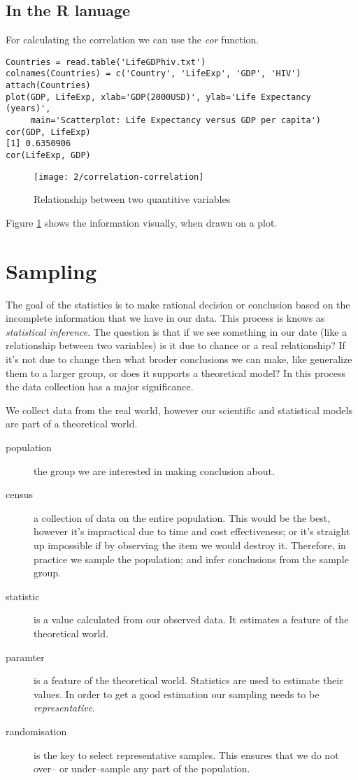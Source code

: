 \subsection{In the R lanuage}

For calculating the correlation we can use the \emph{cor} function.
 
\begin{verbatim}
Countries = read.table('LifeGDPhiv.txt')
colnames(Countries) = c('Country', 'LifeExp', 'GDP', 'HIV')
attach(Countries)
plot(GDP, LifeExp, xlab='GDP(2000USD)', ylab='Life Expectancy (years)', 
     main='Scatterplot: Life Expectancy versus GDP per capita')
cor(GDP, LifeExp)
[1] 0.6350906
cor(LifeExp, GDP)
\end{verbatim}

\begin{figure}[htbp]
\label{fig:correlation}
\caption{Relationship between two quantitive variables}
\texttt{[image: 2/correlation-correlation]}
\end{figure}

Figure \ref{fig:correlation} shows the information visually, when drawn on a
plot.

\section{Sampling}
The goal of the statistics is to make rational decision or conclusion based on
the incomplete information that we have in our data. This process is knows as
\emph{statistical inference}. The question is that if we see something in our
date (like a relationship between two variables) is it due to chance or a real
relationship? If it's not due to change then what broder conclusions we can
make, like generalize them to a larger group, or does it supports a theoretical
model? In this process the data collection has a major significance.

We collect data from the real world, however our scientific and
statistical models are part of a theoretical world. 

\begin{description}
  \item[population] the group we are interested in making conclusion about.
  \item[census] a collection of data on the entire population. This would be the
  best, however it's impractical due to time and cost effectiveness; or it's
  straight up impossible if by observing the item we would destroy it.
  Therefore, in practice we sample the population; and infer conclusions from
  the sample group.
  \item[statistic] is a value calculated from our observed data. It estimates a
  feature of the theoretical world.
  \item[paramter] is a feature of the theoretical world. Statistics are used to
  estimate their values. In order to get a good estimation our sampling needs
  to be \emph{representative}.
  \item[randomisation] is the key to select representative samples. This ensures
  that we do not over-- or under--sample any part of the population.  
\end{description}

